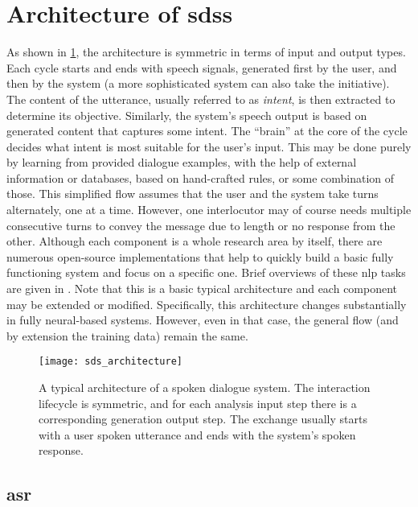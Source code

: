 \section{Architecture of \aclp{sds}}
\label{sec:architecture_sds}

As shown in \cref{fig:sds_architecture}, the architecture is symmetric in terms of input and output types.
Each cycle starts and ends with speech signals, generated first by the user, and then by the system (a more sophisticated system can also take the initiative).
The content of the utterance, usually referred to as \emph{intent}, is then extracted to determine its objective.
Similarly, the system's speech output is based on generated content that captures some intent.
The \enquote{brain} at the core of the cycle decides what intent is most suitable for the user's input.
This may be done purely by learning from provided dialogue examples, with the help of external information or databases, based on hand-crafted rules, or some combination of those.
This simplified flow assumes that the user and the system take turns alternately, one at a time.
However, one interlocutor may of course needs multiple consecutive turns to convey the message due to length or no response from the other.
Although each component is a whole research area by itself, there are numerous open-source implementations that help to quickly build a basic fully functioning system and focus on a specific one.
Brief overviews of these \ac{nlp} tasks are given in .
Note that this is a basic typical architecture and each component may be extended or modified.
Specifically, this architecture changes substantially in fully neural-based systems.
However, even in that case, the general flow (and by extension the training data) remain the same.
%
\begin{figure}[t]
	\centering
	\texttt{[image: sds\_architecture]}
	\caption[Architecture of a spoken dialogue system]
	{A typical architecture of a spoken dialogue system.
	The interaction lifecycle is symmetric, and for each analysis input step there is a corresponding generation output step.
	The exchange usually starts with a user spoken utterance and ends with the system's spoken response.}
	\label{fig:sds_architecture}
\end{figure}

\subsection{\Acl{asr}}
\label{subsec:automatic_speech_recognition}

